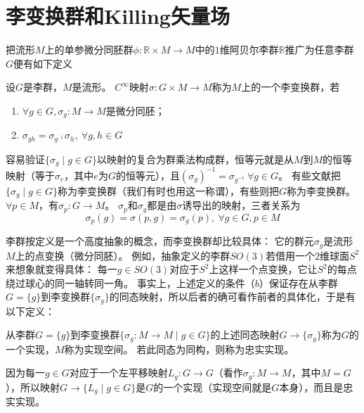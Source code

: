 \section{李变换群和Killing矢量场}

把流形$M$上的单参微分同胚群$\phi \colon \mathbb{R} \times M \to M$中的$1$维阿贝尔李群$\mathbb{R}$推广为任意李群$G$便有如下定义

\begin{definition}
    设$G$是李群，$M$是流形。
    $C^\infty$映射$\sigma \colon G \times M \to M$称为$M$上的一个李变换群，若
    \begin{enumerate}[（a）]
        \item $\forall g \in G, \sigma_g \colon M \to M$是微分同胚；
        \item $\sigma_{gh} = \sigma_g \comp \sigma_h, ~ \forall g, h \in G$
    \end{enumerate}
\end{definition}

容易验证$\{\sigma_g \mid g \in G\}$以映射的复合为群乘法构成群，恒等元就是从$M$到$M$的恒等映射（等于$\sigma_e$，其中$e$为$G$的恒等元），且$(\sigma_g)^{-1} = \sigma_{g^{-1}} ~ \forall g \in G$。
有些文献把$\{\sigma_g \mid g \in G\}$称为李变换群（我们有时也用这一称谓），有些则把$G$称为李变换群。
$\forall p \in M$，有$\sigma_p \colon G \to M$。
$\sigma_p$和$\sigma_g$都是由$\sigma$诱导出的映射，三者关系为
$$\sigma_p(g) = \sigma(p, g) = \sigma_g(p), ~ \forall g \in G, p \in M$$

李群按定义是一个高度抽象的概念，而李变换群却比较具体：
它的群元$\sigma_g$是流形$M$上的点变换（微分同胚）。
例如，抽象定义的李群$SO(3)$若借用一个$2$维球面$S^2$来想象就变得具体：
每一$g \in SO(3)$对应于$S^2$上这样一个点变换，它让$S^2$的每点绕过球心的同一轴转同一角。
事实上，上述定义的条件（$b$）保证存在从李群$G = \{g\}$到李变换群$\{\sigma_g\}$的同态映射，所以后者的确可看作前者的具体化，于是有以下定义：

\begin{definition}
    从李群$G = \{g\}$到李变换群$\{\sigma_g \colon M \to M \mid g \in G\}$的上述同态映射$G \to \{\sigma_g\}$称为$G$的一个实现，$M$称为实现空间。
    若此同态为同构，则称为忠实实现。
\end{definition}

\begin{note}
    因为每一$g \in G$对应于一个左平移映射$L_g \colon G \to G$（看作$\sigma_g \colon M \to M$，其中$M = G$），所以映射$G \to \{L_g \mid g \in G\}$是$G$的一个实现（实现空间就是$G$本身），而且是忠实实现。
\end{note}

